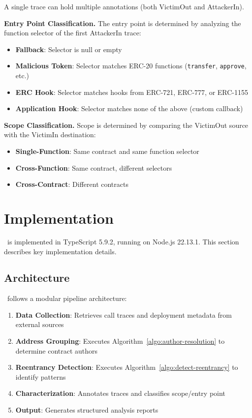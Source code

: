 A single trace can hold multiple annotations (\eg both VictimOut and AttackerIn).

\textbf{Entry Point Classification.} The entry point is determined by analyzing the function selector of the first AttackerIn trace:
\begin{itemize}
    \item \textbf{Fallback}: Selector is null or empty
    \item \textbf{Malicious Token}: Selector matches ERC-20 functions (\lstinline{transfer}, \lstinline{approve}, etc.)
    \item \textbf{ERC Hook}: Selector matches hooks from ERC-721, ERC-777, or ERC-1155
    \item \textbf{Application Hook}: Selector matches none of the above (custom callback)
\end{itemize}

\textbf{Scope Classification.} Scope is determined by comparing the VictimOut source with the VictimIn destination:
\begin{itemize}
    \item \textbf{Single-Function}: Same contract and same function selector
    \item \textbf{Cross-Function}: Same contract, different selectors
    \item \textbf{Cross-Contract}: Different contracts
\end{itemize}

\section{Implementation}
\label{sec:meth-implementation}

\ToolName\ is implemented in TypeScript 5.9.2, running on Node.js 22.13.1. This section describes key implementation details.

\subsection{Architecture}

\ToolName\ follows a modular pipeline architecture:
\begin{enumerate}
    \item \textbf{Data Collection}: Retrieves call traces and deployment metadata from external sources
    \item \textbf{Address Grouping}: Executes Algorithm~\ref{algo:author-resolution} to determine contract authors
    \item \textbf{Reentrancy Detection}: Executes Algorithm~\ref{algo:detect-reentrancy} to identify patterns
    \item \textbf{Characterization}: Annotates traces and classifies scope/entry point
    \item \textbf{Output}: Generates structured analysis reports
\end{enumerate}

